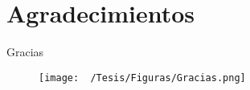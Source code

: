 \chapter*{Agradecimientos}
\label{sec:agradecimientos}
Gracias
\begin{figure}[h]
  \begin{center}
	\texttt{[image: ~/Tesis/Figuras/Gracias.png]}
  \end{center}
\end{figure}
